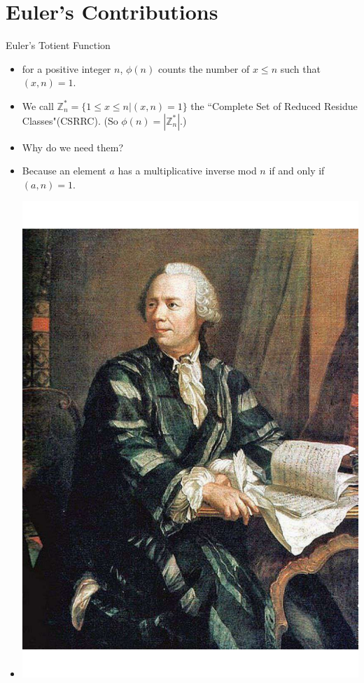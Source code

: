 \documentclass[ %
 usenames,dvipsnames,
aspectratio=169,11pt ]{beamer}
\newenvironment{stepitemize}{\begin{itemize}[<+->]}{\end{itemize} }
\newcommand{\Z}{\mathbb{Z}}
\begin{document}
\section{Euler's Contributions}
\begin{frame}{Euler's Totient Function}
\begin{stepitemize}
    \item for a positive integer $n$, $\phi(n)$ counts the number of $x\leq n$ such that $(x,n)=1$.
    \item We call $\Z_n^{*} = \{1\leq x\leq n| (x,n)=1\}$ the ``Complete Set of Reduced Residue Classes"(CSRRC). (So $\phi(n)=|\Z_n^{*}|$.)
    \item Why do we need them?
    \item Because an element $a$ has a multiplicative inverse mod $n$ if and only if $(a,n)=1$.
    \item[]     \begin{center}
    \includegraphics[scale=.170]{images/Leonhard-Euler.pdf}
\end{center}

\end{stepitemize}

\end{frame}
\end{document}
